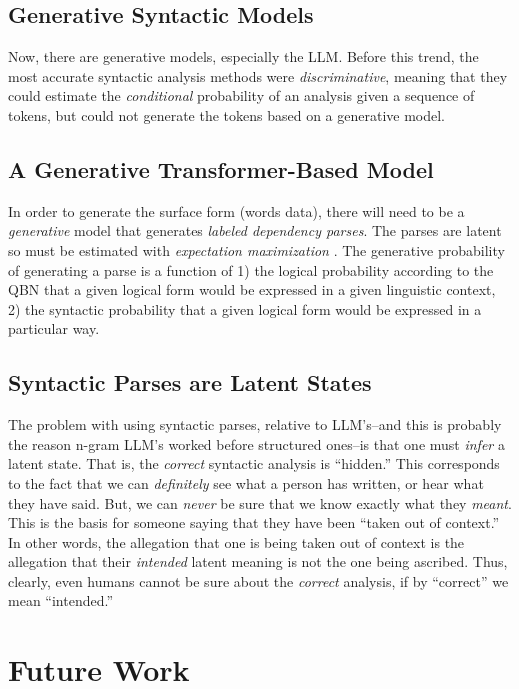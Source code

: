 \documentclass[12pt]{article}
\begin{document}
\subsection{Generative Syntactic Models}
Now, there are generative models, especially the LLM.
Before this trend, the most accurate syntactic analysis methods were {\em discriminative}, meaning that they could estimate the {\em conditional} probability of an analysis given a sequence of tokens, but could not generate the tokens based on a generative model.

\subsection{A Generative Transformer-Based Model}
In order to generate the surface form (words data), there will need to be a {\em generative} model that generates {\em labeled dependency parses}.
The parses are latent so must be estimated with {\em expectation maximization} \cite{baum1966statistical,Jelinek1997, rabiner1989tutorial}.
The generative probability of generating a parse is a function of 1) the logical probability according to the QBN that a given logical form would be expressed in a given linguistic context, 2) the syntactic probability that a given logical form would be expressed in a particular way.

\subsection{Syntactic Parses are Latent States}
The problem with using syntactic parses, relative to LLM's--and this is probably the reason n-gram LLM's worked before structured ones--is that one must {\em infer} a latent state.
That is, the {\em correct} syntactic analysis is ``hidden.''
This corresponds to the fact that we can {\em definitely} see what a person has written, or hear what they have said.
But, we can {\em never} be sure that we know exactly what they {\em meant}.
This is the basis for someone saying that they have been ``taken out of context.''
In other words, the allegation that one is being taken out of context is the allegation that their {\em intended} latent meaning is not the one being ascribed.
Thus, clearly, even humans cannot be sure about the {\em correct} analysis, if by ``correct'' we mean ``intended.''


\section{Future Work}
\end{document}
